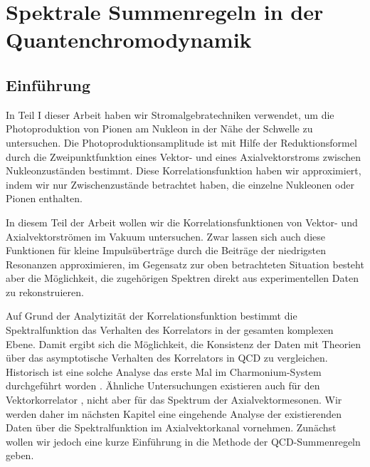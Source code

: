 \chapter[Spektrale Summenregeln in der QCD]{Spektrale Summenregeln 
in der Quantenchromodynamik}
\section{Einf\"uhrung}
In Teil I dieser Arbeit haben wir Stromalgebratechniken verwendet,
um die Photoproduktion von Pionen am Nukleon in der N\"ahe der Schwelle 
zu untersuchen. Die Photoproduktionsamplitude ist mit Hilfe
der Reduktionsformel durch die Zweipunktfunktion eines Vektor- und 
eines Axialvektorstroms zwischen Nukleonzust\"anden bestimmt. Diese 
Korrelationsfunktion haben wir approximiert, indem wir nur Zwischenzust\"ande 
betrachtet haben, die einzelne Nukleonen oder Pionen enthalten.  

In diesem Teil der Arbeit wollen wir die Korrelationsfunktionen von
Vektor- und Axialvektorstr\"omen im Vakuum untersuchen. Zwar lassen 
sich auch diese Funktionen f\"ur kleine Impuls\"ubertr\"age durch die
Beitr\"age der niedrigsten Resonanzen approximieren, im Gegensatz 
zur oben betrachteten Situation besteht aber die M\"oglichkeit, die
zugeh\"origen Spektren direkt aus experimentellen Daten 
zu rekonstruieren. 

Auf Grund der Analytizit\"at der Korrelationsfunktion bestimmt die
Spektralfunktion das Verhalten des Korrelators in der gesamten 
komplexen Ebene. Damit ergibt sich die M\"oglichkeit,
die Konsistenz der Daten mit Theorien \"uber das asymptotische 
Verhalten des  Korrelators in QCD zu vergleichen. Historisch ist 
eine solche Analyse das erste Mal im  Charmonium-System durchgef\"uhrt
worden \cite{NOS78}. \"Ahnliche Untersuchungen existieren auch  f\"ur
den Vektorkorrelator \cite{LNT84,CM90,Cap91}, nicht aber f\"ur das 
Spektrum der Axialvektormesonen. Wir werden daher im n\"achsten 
Kapitel eine eingehende Analyse der existierenden Daten \"uber die 
Spektralfunktion im Axialvektorkanal vornehmen. Zun\"achst wollen wir 
jedoch eine kurze Einf\"uhrung in die Methode der QCD-Summenregeln geben. 

